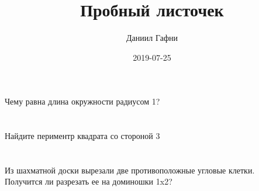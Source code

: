 \documentclass{article}%
\title{Пробный листочек}%
\author{Даниил Гафни}%
\date{2019{-}07{-}25}%
\begin{document}
%
\normalsize%
\maketitle%
\section{}%
\label{sec:}%
Чему равна длина окружности радиусом 1?%
%
\iffalse%
Автор: Даниил Гафни%
Дата: 2019{-}24{-}07%
Название: None%
Подсказка: \textbackslash{}\textbackslash{}%
Длину окружности можно вычислить по формуле $L=2 \pi R$%
\fi

%
\section{}%
\label{sec:}%
Найдите периментр квадрата со стороной 3%
%
\iffalse%
Автор: Даниил Гафни%
Дата: 2019{-}25{-}07%
Название: None%
Подсказка: \textbackslash{}\textbackslash{}%
Сложите длины сторон квадрата: $a + a + a + a$%
\fi

%
\section{}%
\label{sec:}%
Из шахматной доски вырезали две противоположные угловые клетки.\\
Получится ли разрезать ее на доминошки 1x2?%
%
\iffalse%
Автор: Даниил Гафни%
Дата: 2019{-}25{-}07%
Название: None%
Подсказка: \textbackslash{}\textbackslash{}%
Подсчитайте количество белых и черных клеток.%
\fi

%
\end{document}
